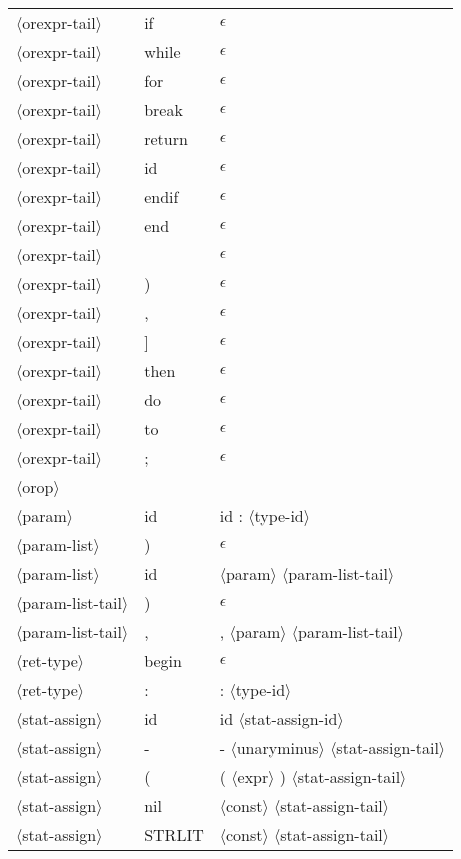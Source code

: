 \documentclass[11pt, fleqn]{article}
\newcommand{\atag}[1]{$\langle$#1$\rangle$}
\begin{document}
\begin{longtable}{l|l|l}
\atag{orexpr-tail}				&	 if		&	$\epsilon$	\\
\atag{orexpr-tail}				&	 while		&	$\epsilon$	\\
\atag{orexpr-tail}				&	 for		&	$\epsilon$	\\
\atag{orexpr-tail}				&	 break		&	$\epsilon$	\\
\atag{orexpr-tail}				&	 return		&	$\epsilon$	\\
\atag{orexpr-tail}				&	 id		&	$\epsilon$	\\
\atag{orexpr-tail}				&	 endif		&	$\epsilon$	\\
\atag{orexpr-tail}				&	 end		&$\epsilon$		\\
\atag{orexpr-tail}				&	 \textbar		&	$\epsilon$	\\
\atag{orexpr-tail}				&	 )		&	$\epsilon$	\\
\atag{orexpr-tail}				&	 ,		&	$\epsilon$	\\
\atag{orexpr-tail}				&	 ]		&	$\epsilon$	\\
\atag{orexpr-tail}				&	 then		&	$\epsilon$	\\
\atag{orexpr-tail}				&	 do		&	$\epsilon$	\\
\atag{orexpr-tail}				&	 to		&	$\epsilon$	\\
\atag{orexpr-tail}				&	 ;		&	$\epsilon$	\\
\atag{orop} 						&	\textbar		&	\textbar	\\
\atag{param}						&	id		&	id : \atag{type-id}		\\
\atag{param-list}				&	)		&	$\epsilon$	\\
\atag{param-list}				&	id		&	\atag{param}	 \atag{param-list-tail}	\\
\atag{param-list-tail}			&	)		&	$\epsilon$	\\
\atag{param-list-tail}			&	,		&	, \atag{param} \atag{param-list-tail}	\\
\atag{ret-type}					&	begin	&	$\epsilon$	\\
\atag{ret-type}					&	:		&	: \atag{type-id}		\\
\atag{stat-assign}				&	id		&	id \atag{stat-assign-id}		\\
\atag{stat-assign}				&	-		&	- \atag{unaryminus} \atag{stat-assign-tail}		\\
\atag{stat-assign}				&	(		&	( \atag{expr} ) \atag{stat-assign-tail}		\\
\atag{stat-assign}				&	nil		&	\atag{const}	 \atag{stat-assign-tail}		\\
\atag{stat-assign}				&	STRLIT		&	\atag{const}	 \atag{stat-assign-tail}		\\

\end{longtable}
\end{document}
